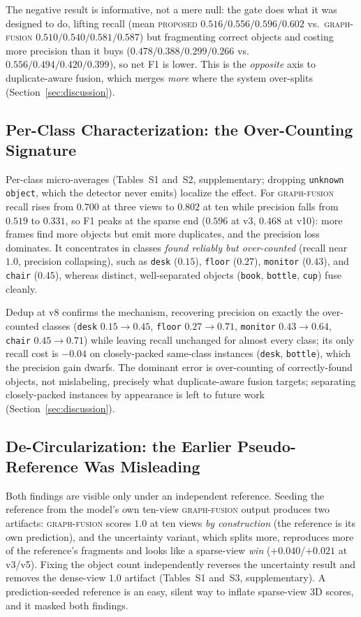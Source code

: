 The negative result is informative, not a mere null: the gate does what it was designed to do, lifting
recall (mean \textsc{proposed} $0.516/0.556/0.596/0.602$ vs.\ \textsc{graph-fusion}
$0.510/0.540/0.581/0.587$) but fragmenting correct objects and costing more precision than it buys
($0.478/0.388/0.299/0.266$ vs.\ $0.556/0.494/0.420/0.399$), so net F1 is lower. This is the
\emph{opposite} axis to duplicate-aware fusion, which merges \emph{more} where the system over-splits
(Section~\ref{sec:discussion}).

\subsection{Per-Class Characterization: the Over-Counting Signature}
\label{subsec:perclass}

Per-class micro-averages (Tables~S1 and~S2, supplementary; dropping \texttt{unknown object}, which the
detector never emits) localize the effect. For \textsc{graph-fusion} recall rises from $0.700$ at three
views to $0.802$ at ten while precision falls from $0.519$ to $0.331$, so F1 peaks at the sparse end
($0.596$ at v3, $0.468$ at v10): more frames find more objects but emit more duplicates, and the
precision loss dominates. It concentrates in classes \emph{found reliably but over-counted} (recall near
$1.0$, precision collapsing), such as \texttt{desk} ($0.15$), \texttt{floor} ($0.27$), \texttt{monitor}
($0.43$), and \texttt{chair} ($0.45$), whereas distinct, well-separated objects (\texttt{book},
\texttt{bottle}, \texttt{cup}) fuse cleanly.

Dedup at v8 confirms the mechanism, recovering precision on exactly the over-counted classes
(\texttt{desk} $0.15\to0.45$, \texttt{floor} $0.27\to0.71$, \texttt{monitor} $0.43\to0.64$,
\texttt{chair} $0.45\to0.71$) while leaving recall unchanged for almost every class; its only recall
cost is $-0.04$ on closely-packed same-class instances (\texttt{desk}, \texttt{bottle}), which the
precision gain dwarfs. The dominant error is over-counting of correctly-found objects, not mislabeling,
precisely what duplicate-aware fusion targets; separating closely-packed instances by appearance is left
to future work (Section~\ref{sec:discussion}).

\subsection{De-Circularization: the Earlier Pseudo-Reference Was Misleading}
\label{subsec:decirc}

Both findings are visible only under an independent reference. Seeding the reference from the model's own
ten-view \textsc{graph-fusion} output produces two artifacts: \textsc{graph-fusion} scores $1.0$ at ten
views \emph{by construction} (the reference is its own prediction), and the uncertainty variant, which
splits more, reproduces more of the reference's fragments and looks like a sparse-view \emph{win}
($+0.040$/$+0.021$ at v3/v5). Fixing the object count independently reverses the uncertainty result and
removes the dense-view $1.0$ artifact (Tables~S1 and~S3, supplementary). A prediction-seeded reference is
an easy, silent way to inflate sparse-view 3D scores, and it masked both findings.